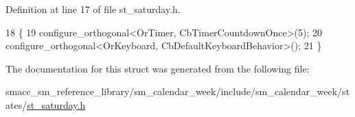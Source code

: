 Definition at line 17 of file st\+\_\+saturday.\+h.


\begin{DoxyCode}
18     \{
19         configure\_orthogonal<OrTimer,  CbTimerCountdownOnce>(5);   
20         configure\_orthogonal<OrKeyboard, CbDefaultKeyboardBehavior>();
21     \}
\end{DoxyCode}


The documentation for this struct was generated from the following file\+:\begin{DoxyCompactItemize}
\item 
smacc\+\_\+sm\+\_\+reference\+\_\+library/sm\+\_\+calendar\+\_\+week/include/sm\+\_\+calendar\+\_\+week/states/\hyperlink{st__saturday_8h}{st\+\_\+saturday.\+h}\end{DoxyCompactItemize}
